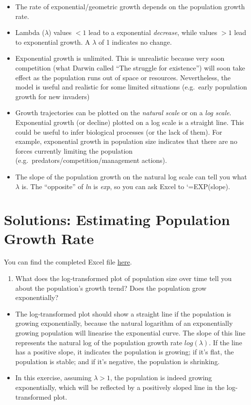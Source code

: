 \documentclass[
  a4paper]{book}
\providecommand{\tightlist}{%
  \setlength{\itemsep}{0pt}\setlength{\parskip}{0pt}}
\begin{document}
\begin{itemize}
\tightlist
\item
  The rate of exponential/geometric growth depends on the population growth rate.
\item
  Lambda (\(\lambda\)) values \(<1\) lead to a exponential \emph{decrease}, while values \(>1\) lead to exponential growth. A \(\lambda\) of 1 indicates no change.
\item
  Exponential growth is unlimited. This is unrealistic because very soon competition (what Darwin called ``The struggle for existence'') will soon take effect as the population runs out of space or resources. Nevertheless, the model is useful and realistic for some limited situations (e.g.~early population growth for new invaders)
\item
  Growth trajectories can be plotted on the \emph{natural scale} or on a \emph{log scale}. Exponential growth (or decline) plotted on a log scale is a straight line. This could be useful to infer biological processes (or the lack of them). For example, exponential growth in population size indicates that there are no forces currently limiting the population (e.g.~predators/competition/management actions).
\item
  The slope of the population growth on the natural log scale can tell you what \(\lambda\) is. The ``opposite'' of \emph{ln} is \emph{exp}, so you can ask Excel to `=EXP(slope).
\end{itemize}

\section{Solutions: Estimating Population Growth Rate}\label{solutions-estimating-population-growth-rate}

You can find the completed Excel file \href{https://www.dropbox.com/scl/fi/sxvtkuwxs0mn9ohgwh0ot/EstimatingGrowth_completed.xlsx?rlkey=lzefpmqt3ishxze4weoy9nz65&dl=1}{here}.

\begin{enumerate}
\def\labelenumi{\arabic{enumi}.}
\tightlist
\item
  What does the log-transformed plot of population size over time tell you about the population's growth trend? Does the population grow exponentially?
\end{enumerate}

\begin{itemize}
\tightlist
\item
  The log-transformed plot should show a straight line if the population is growing exponentially, because the natural logarithm of an exponentially growing population will linearise the exponential curve. The slope of this line represents the natural log of the population growth rate \(log(\lambda)\). If the line has a positive slope, it indicates the population is growing; if it's flat, the population is stable; and if it's negative, the population is shrinking.
\item
  In this exercise, assuming \(\lambda > 1\), the population is indeed growing exponentially, which will be reflected by a positively sloped line in the log-transformed plot.
\end{itemize}
\end{document}
